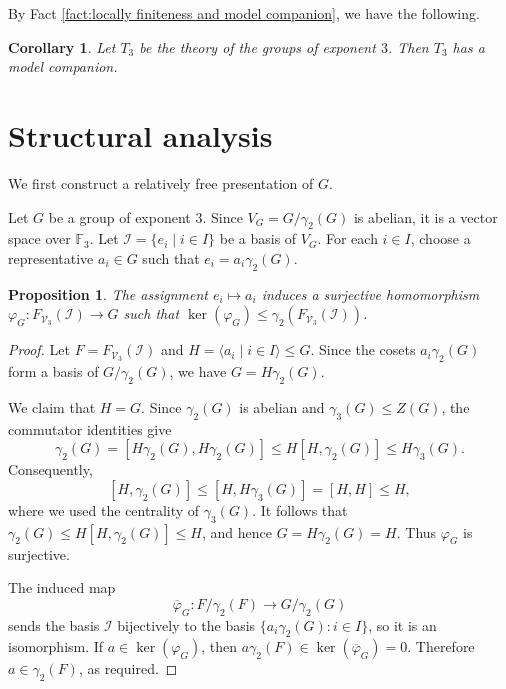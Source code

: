 \documentclass[11pt,reqno]{article}
\newtheorem{proposition}[theorem]{Proposition}
\newtheorem{corollary}[theorem]{Corollary}
\theoremstyle{definition}
\theoremstyle{remark}
\begin{document}
By Fact \ref{fact:locally finiteness and model companion}, we have the following.
\begin{corollary}
    Let $T_3$ be the theory of the groups of exponent $3$. Then $T_3$ has a model companion.
\end{corollary}


\section{Structural analysis}
\label{sec:structure}

We first construct a relatively free presentation of $G$.

Let $G$ be a group of exponent $3$.
Since $V_G=G/\gamma_2(G)$ is abelian, it is a vector space over $\mathbb F_3$.
Let $\mathcal I=\{e_i\mid i\in I\}$ be a basis of $V_G$.  For each $i\in I$,
choose a representative $a_i\in G$ such that
$e_i=a_i\gamma_2(G)$.

\begin{proposition}\label{proposition:lift}
    The assignment $e_i\mapsto a_i$ induces a surjective homomorphism
    $\varphi_G:F_{\mathcal V_3}(\mathcal I)\to G$ such that
    $\ker(\varphi_G)\leq\gamma_2(F_{\mathcal V_3}(\mathcal I))$.
\end{proposition}

\begin{proof}
    Let $F=F_{\mathcal V_3}(\mathcal I)$ and
    $H=\langle a_i\mid i\in I\rangle\leq G$.  Since the cosets
    $a_i\gamma_2(G)$ form a basis of $G/\gamma_2(G)$, we have
    $G=H\gamma_2(G)$.

    We claim that $H=G$.  Since $\gamma_2(G)$ is abelian and
    $\gamma_3(G)\leq Z(G)$, the commutator identities give
    \[
    \gamma_2(G)
    =[H\gamma_2(G),H\gamma_2(G)]
    \leq H[H,\gamma_2(G)]
    \leq H\gamma_3(G).
    \]
    Consequently,
    \[
    [H,\gamma_2(G)]
    \leq[H,H\gamma_3(G)]
    =[H,H]
    \leq H,
    \]
    where we used the centrality of $\gamma_3(G)$.  It follows that
    $\gamma_2(G)\leq H[H,\gamma_2(G)]\leq H$, and hence
    $G=H\gamma_2(G)=H$.  Thus $\varphi_G$ is surjective.

    The induced map
    \[
    \overline{\varphi}_G:F/\gamma_2(F)\longrightarrow G/\gamma_2(G)
    \]
    sends the basis $\mathcal I$ bijectively to the basis
    $\{a_i\gamma_2(G):i\in I\}$, so it is an isomorphism.  If
    $a\in\ker(\varphi_G)$, then
    $a\gamma_2(F)\in\ker(\overline{\varphi}_G)=0$.  Therefore
    $a\in\gamma_2(F)$, as required.
\end{proof}
\end{document}
